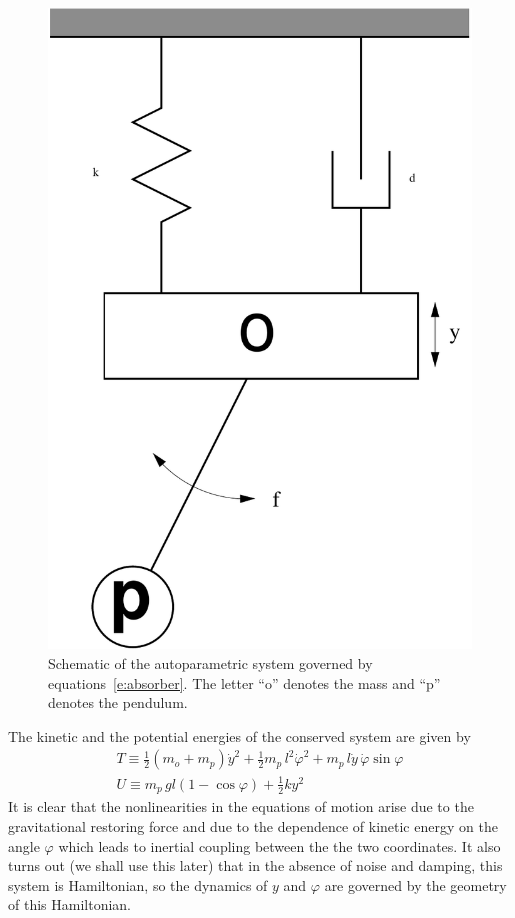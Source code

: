 \begin{figure}
\begin{center}
\includegraphics[width=\textwidth*7/8]{figures/autoparam_schematic}
\caption{Schematic of the autoparametric system governed by equations~\eqref{e:absorber}. The letter ``o'' denotes the mass and ``p'' denotes the pendulum.}
\label{F:ap schematic}
\end{center}
\end{figure}
The kinetic and the potential energies of the conserved system are given by
\begin{gather*}
T \equiv \frac12 (m_o + m_p){\dot y}^2 + \frac12 m_p \, l^2 {\dot \varphi}^2 + m_p \, l \dot y \, \dot \varphi \sin \varphi\\
U \equiv m_p \, g l ( 1 -\cos \varphi) + \frac12 k y^2
\end{gather*}
It is clear that the nonlinearities in the equations of motion arise due to the gravitational restoring force and due to the dependence of kinetic energy on the angle $\varphi$ which leads to inertial coupling between the the two coordinates. It also turns out (we shall use this later) that in the absence of noise and damping, this system is Hamiltonian, so the dynamics of $y$ and $\varphi$ are governed by the geometry of this Hamiltonian.

